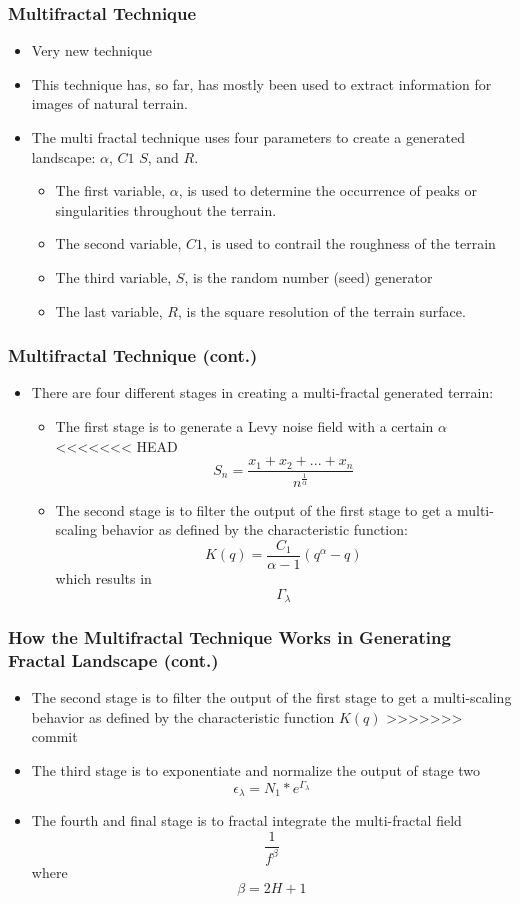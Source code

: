\documentclass{beamer}
\begin{document}
\begin{frame}
 \frametitle{Multifractal Technique}
\begin{itemize}
\item Very new technique
\item This technique has, so far, has mostly been used to extract information for images of natural terrain. 
\item The multi fractal technique uses four parameters to create a generated landscape: $\alpha$, $C1$ $S$, and $R$. 
\begin{itemize}
\item The first variable, $\alpha$, is used to determine the occurrence of peaks or singularities throughout the terrain.
\item The second variable, $C1$, is used to contrail the roughness of the terrain
\item The third variable, $S$, is the random number (seed) generator
\item The last variable, $R$, is the square resolution of the terrain surface.
\end{itemize}
\end{itemize}
\end{frame}


\begin{frame}
\frametitle{Multifractal Technique (cont.)}
\begin{itemize}
\item There are four different stages in creating a multi-fractal generated terrain:
\begin{itemize}
\item The first stage is to generate a Levy noise field with a certain $\alpha$
<<<<<<< HEAD
$${S_{n}} = \frac{{x_{1}} + {x_{2}} + ... + {x_{n}}}{n^{\frac{1}{\alpha}}}$$
\item The second stage is to filter the output of the first stage to get a multi-scaling behavior as defined by the characteristic function: 
$$K(q) = \frac{C_{1}}{\alpha - 1}\left(q^{\alpha} - q\right)$$ which results in $${\Gamma_{\lambda}}$$
\end{itemize}
\end{itemize}
\end{frame}

\begin{frame}
\frametitle{How the Multifractal Technique Works in Generating Fractal Landscape (cont.)}
\begin{itemize}
=======
\item The second stage is to filter the output of the first stage to get a multi-scaling behavior as defined by the characteristic function $K(q)$
>>>>>>> commit
\item The third stage is to exponentiate and normalize the output of stage two
$${\epsilon_{\lambda}} = {N_{1}} * e^{{\Gamma_{\lambda}}}$$
\item The fourth and final stage is to fractal integrate the multi-fractal field
$$\frac{1}{f^{\beta}}$$ where $$\beta = 2H + 1$$
\end{itemize}
\end{frame}
\end{document}
